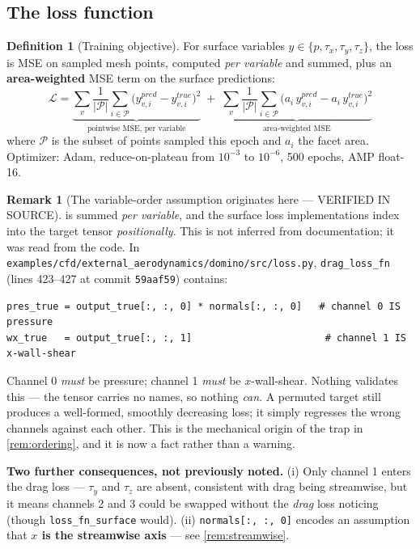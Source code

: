 \documentclass[10pt,a4paper]{article}
\theoremstyle{definition}
\newtheorem{definition}{Definition}[section]
\newtheorem{remark}{Remark}[section]
\begin{document}
\subsection{The loss function}

\begin{definition}[Training objective]
\label{def:loss}
For surface variables $y \in \{p, \tau_x, \tau_y, \tau_z\}$, the loss is MSE on
sampled mesh points, computed \emph{per variable} and summed, plus an
\textbf{area-weighted} MSE term on the surface predictions:
\begin{equation}
\mathcal{L}
= \underbrace{\sum_{v} \frac{1}{|\mathcal{P}|}\sum_{i \in \mathcal{P}}
   \bigl(y^{pred}_{v,i} - y^{true}_{v,i}\bigr)^2}_{\text{pointwise MSE, per variable}}
\;+\;
  \underbrace{\sum_{v} \frac{1}{|\mathcal{P}|}\sum_{i \in \mathcal{P}}
   \bigl(a_i\, y^{pred}_{v,i} - a_i\, y^{true}_{v,i}\bigr)^2}
   _{\text{area-weighted MSE}}
\label{eq:loss}
\end{equation}
where $\mathcal{P}$ is the subset of points sampled this epoch and $a_i$ the facet
area. Optimizer: Adam, reduce-on-plateau from $10^{-3}$ to $10^{-6}$, 500 epochs,
AMP float-16.
\end{definition}

\begin{remark}[The variable-order assumption originates here --- VERIFIED IN SOURCE]
 is summed \emph{per variable}, and the surface loss implementations index
into the target tensor \emph{positionally}. This is not inferred from documentation; it
was read from the code. In
\texttt{examples/cfd/external\_aerodynamics/domino/src/loss.py}, \texttt{drag\_loss\_fn}
(lines 423--427 at commit \texttt{59aaf59}) contains:
\begin{lstlisting}
pres_true = output_true[:, :, 0] * normals[:, :, 0]   # channel 0 IS pressure
wx_true   = output_true[:, :, 1]                       # channel 1 IS x-wall-shear
\end{lstlisting}
Channel 0 \emph{must} be pressure; channel 1 \emph{must} be $x$-wall-shear. Nothing
validates this --- the tensor carries no names, so nothing \emph{can}. A permuted target
still produces a well-formed, smoothly decreasing loss; it simply regresses the wrong
channels against each other. This is the mechanical origin of the trap in
\cref{rem:ordering}, and it is now a fact rather than a warning.

\textbf{Two further consequences, not previously noted.} (i) Only channel 1 enters the
drag loss --- $\tau_y$ and $\tau_z$ are absent, consistent with drag being streamwise, but
it means channels 2 and 3 could be swapped without the \emph{drag} loss noticing (though
\texttt{loss\_fn\_surface} would). (ii) \texttt{normals[:, :, 0]} encodes an assumption
that \textbf{$x$ is the streamwise axis} --- see \cref{rem:streamwise}.
\end{remark}
\end{document}

